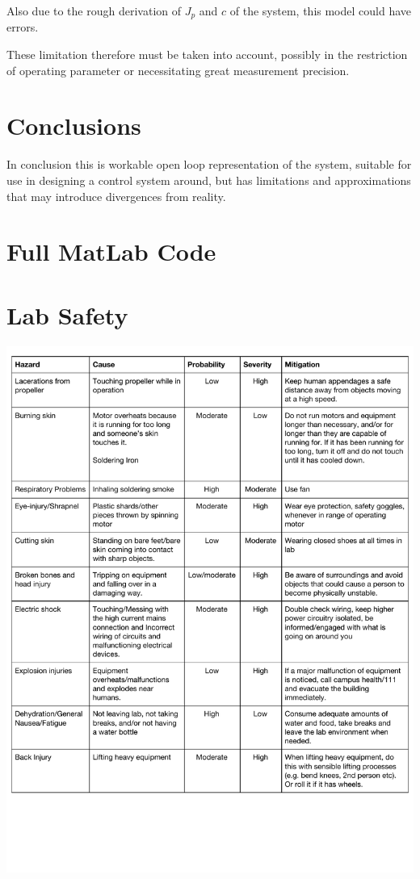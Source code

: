 \documentclass[a4paper,11pt]{article}
\begin{document}
Also due to the rough derivation of $J_p$ and $c$ of the system, this model could have errors.


These limitation therefore must be taken into account, possibly in the restriction of operating parameter or necessitating great measurement precision.
\section{Conclusions}
In conclusion this is workable open loop representation of the system, suitable for use in designing a control system around, but has limitations and approximations that may introduce divergences from reality.




\newpage

    \section{Full MatLab Code}
    
    \section{Lab Safety}
    \includegraphics[width=\textwidth]{inc/safety.pdf}
    
\end{document}
